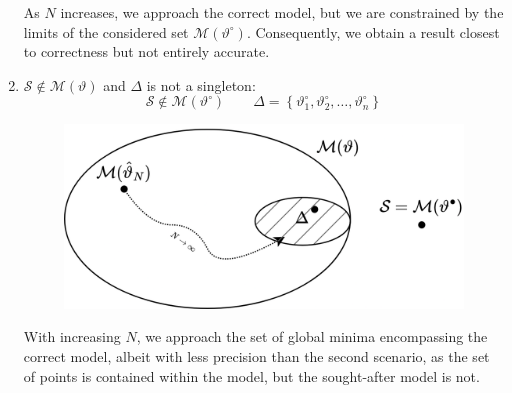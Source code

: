 \begin{enumerate}
\begin{figure}[H]
        \end{figure}
        As $N$ increases, we approach the correct model, but we are constrained by the limits of the considered set $\mathcal{M}(\vartheta^\circ)$. 
        Consequently, we obtain a result closest to correctness but not entirely accurate.
    \item $\mathcal{S} \notin \mathcal{M}(\vartheta)$ and $\Delta$ is not a singleton: 
        \[\mathcal{S}\notin\mathcal{M}(\vartheta^\circ)  \qquad \Delta=\left\{ \vartheta^\circ_1,\vartheta^\circ_2,\dots,\vartheta^\circ_n \right\}\]
        \begin{figure}[H]
            \centering
            \includegraphics[width=0.55\linewidth]{images/four.png}
        \end{figure}
        With increasing $N$, we approach the set of global minima encompassing the correct model, albeit with less precision than the second scenario, as the set of points is contained within the model, but the sought-after model is not.
\end{enumerate}